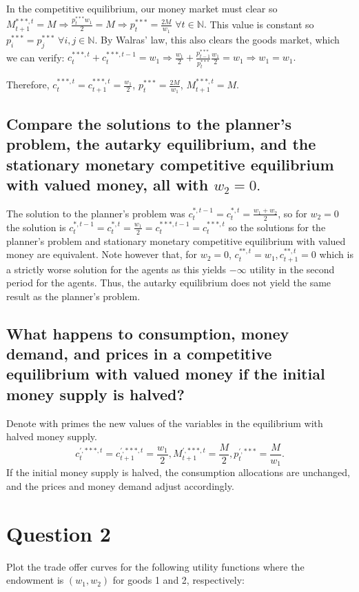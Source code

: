 \documentclass[11pt]{article} %
\begin{document}
In the competitive equilibrium, our money market must clear so $M_{t+1}^{***,t} = M \Rightarrow \frac{p_t^{***} w_1}{2} = M \Rightarrow p_t^{***} = \frac{2M}{w_1}$ $\forall t \in \mathbb{N}.$ This value is constant so $p_i^{***} = p_j^{***}$ $\forall i,j \in \mathbb{N}.$ By Walras' law, this also clears the goods market, which we can verify: $c_t^{***,t} + c_t^{***,t-1} = w_1 \Rightarrow \frac{w_1}{2} + \frac{p_{t-1}^{***}}{p_t^{***}}\frac{w_1}{2} = w_1 \Rightarrow w_1 = w_1.$

Therefore, $c_t^{***,t} = c_{t+1}^{***,t} = \frac{w_1}{2}$, $p_t^{***} =  \frac{2M}{w_1}$, $M_{t+1}^{***,t} = M.$

\subsection{Compare the solutions to the planner's problem, the autarky equilibrium, and the stationary monetary competitive equilibrium with valued money, all with $w_2 = 0.$}
The solution to the planner's problem was  $c_t^{*,t-1} = c_t^{*,t} = \frac{w_1 + w_2}{2}$, so for $w_2 = 0$ the solution is $c_t^{*,t-1} = c_t^{*,t} = \frac{w_1}{2} = c_t^{***,t-1} = c_t^{***,t}$ so the solutions for the planner's problem and stationary monetary competitive equilibrium with valued money are equivalent. Note however that, for $w_2 = 0$, $c_t^{**,t} = w_1, c_{t+1}^{**,t} = 0$ which is a strictly worse solution for the agents as this yields $-\infty$ utility in the second period for the agents. Thus, the autarky equilibrium does not yield the same result as the planner's problem.

\subsection{What happens to consumption, money demand, and prices in a competitive equilibrium with valued money if the initial money supply is halved?}
Denote with primes the new values of the variables in the equilibrium with halved money supply.
\begin{equation*}
c_t^{',***,t} = c_{t+1}^{',***,t} = \frac{w_1}{2}, M_{t+1}^{',***,t} = \frac{M}{2}, p_t^{',***} =  \frac{M}{w_1}.
\end{equation*}
If the initial money supply is halved, the consumption allocations are unchanged, and the prices and money demand adjust accordingly.

\section{Question 2}
Plot the trade offer curves for the following utility functions where the endowment is $(w_1,w_2)$ for goods 1 and 2, respectively:
\end{document}

